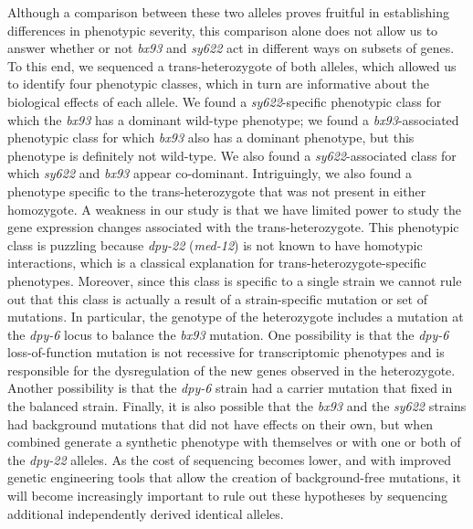 \documentclass[10pt, onecolumn]{article}
\newcommand{\gene}[1]{\mbox{\emph{#1}}}
\newcommand{\dpy}{\gene{dpy-22} (\emph{med-12})}
\begin{document}
Although a comparison between these two alleles proves fruitful in establishing
differences in phenotypic severity, this comparison alone does not allow us to
answer whether or not \emph{bx93} and \emph{sy622} act in different ways on
subsets of genes. To this end, we sequenced a trans-heterozygote of both
alleles, which allowed us to identify four phenotypic classes, which in turn are
informative about the biological effects of each allele. We found a
\emph{sy622}-specific phenotypic class for which the \emph{bx93} has a dominant
wild-type phenotype; we found a \emph{bx93}-associated phenotypic class for
which \emph{bx93} also has a dominant phenotype, but this phenotype is
definitely not wild-type. We also found a \emph{sy622}-associated class for
which \emph{sy622} and \emph{bx93} appear co-dominant. Intriguingly, we also
found a phenotype specific to the trans-heterozygote that was not present in
either homozygote. A weakness in our study is that we have limited power to
study the gene expression changes associated with the trans-heterozygote. This
phenotypic class is puzzling because \dpy{} is not known to have homotypic
interactions, which is a classical explanation for trans-heterozygote-specific
phenotypes. Moreover, since this class is specific to a single strain we cannot
rule out that this class is actually a result of a strain-specific mutation or
set of mutations. In particular, the genotype of the heterozygote includes a
mutation at the \gene{dpy-6} locus to balance the \emph{bx93} mutation. One
possibility is that the \emph{dpy-6} loss-of-function mutation is not recessive
for transcriptomic phenotypes and is responsible for the dysregulation of the
new genes observed in the heterozygote. Another possibility is that the
\emph{dpy-6} strain had a carrier mutation that fixed in the balanced strain.
Finally, it is also possible that the \emph{bx93} and the \emph{sy622} strains
had background mutations that did not have effects on their own, but when
combined generate a synthetic phenotype with themselves or with one or both of
the \gene{dpy-22} alleles. As the cost of sequencing becomes lower, and with
improved genetic engineering tools that allow the creation of background-free
mutations, it will become increasingly important to rule out these hypotheses by
sequencing additional independently derived identical alleles.
\end{document}
